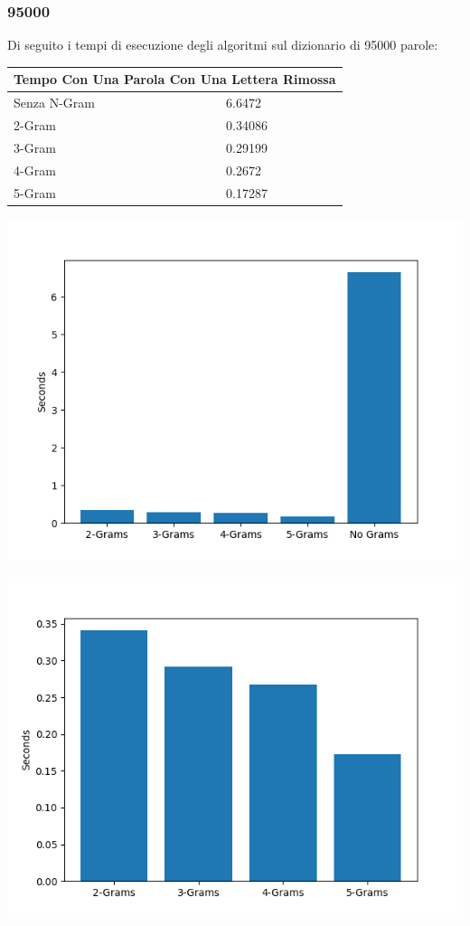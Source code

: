 \documentclass{article}
\begin{document}
\subsubsection{95000}
Di seguito i tempi di esecuzione degli algoritmi sul dizionario di 95000 parole:
\medskip

\begin{tabular}{ |p{3cm}||p{3.5cm}|  }
 \hline
 \multicolumn{2}{|c|}{Tempo Con Una Parola Con Una Lettera Rimossa} \\
\hline
 Senza N-Gram  &   6.6472\\\hline
 2-Gram &  0.34086  \\\hline
 3-Gram & 0.29199 \\\hline
 4-Gram & 0.2672\\\hline
 5-Gram & 0.17287  \\
 \hline
\end{tabular}

\includegraphics[scale=0.5]{img/LetteraRimossa_95000_parole.png}

\includegraphics[scale=0.5]{img/LetteraRimossaSoloGram_95000_parole.png}
\end{document}
